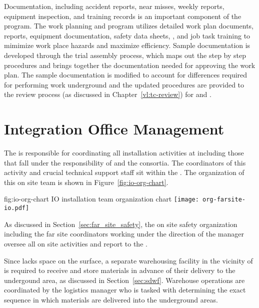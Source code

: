Documentation, including accident reports, near misses, weekly
reports, equipment inspection, and training records is an important
component of the   program. The work
planning and  program utilizes detailed work plan documents,
 reports, equipment documentation, safety data sheets,
, and job task training to mimimize work place hazards and
maximize efficiency.  Sample documentation is developed through the
 trial assembly process, which maps out the step by
step procedures and brings together the documentation needed for
approving the work plan.  The sample documentation is modified to
account for differences required for performing work underground and
the updated procedures are provided to the review process (as
discussed in Chapter~\ref{vl:tc-review}) for  and
.

\section{Integration Office Management}
\label{vl:tc-facility_mgmt}

The  is responsible for coordinating all installation
activities at  including those that fall under the %
responsibility of  and the  consortia.  
The coordinators of this activity and crucial technical support
staff sit within the .  The organization of this on site team is 
shown in Figure~\ref{fig:io-org-chart}.
\begin{dunefigure}{fig:io-org-chart}
  {IO installation team organization chart}
  \texttt{[image: org-farsite-io.pdf]}
\end{dunefigure}
 
As discussed in Section~\ref{sec:far_site_safety}, the on site safety
organization including the far site  coordinators
working under the direction of the  
manager oversee all on site activities and report 
to the .

Since  lacks space on the surface, a separate
warehousing facility in the vicinity of  is required to
receive and store materials in advance of their delivery to the
undergound area, as discussed in Section~\ref{sec:sdwf}.  Warehouse
operations are coordinated by the  logistics manager
who is tasked with determining the exact sequence in which materials
are delivered into the underground areas.

